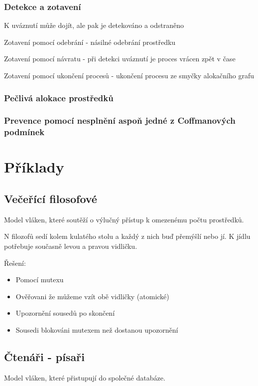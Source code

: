 \documentclass{szzclass}
\begin{document}
\subsubsection{Detekce a zotavení}
K uváznutí může dojít, ale pak je detekováno a odstraněno

Zotavení pomocí odebrání - násilné odebrání prostředku

Zotavení pomocí návratu - při detekci uváznutí je proces vrácen zpět v čase

Zotavení pomocí ukončení procesů - ukončení procesu ze smyčky alokačního grafu

\subsubsection{Pečlivá alokace prostředků}

\subsubsection{Prevence pomocí nesplnění aspoň jedné z Coffmanových podmínek}

\section{Příklady}

\subsection{Večeřící filosofové}
Model vláken, které soutěží o výlučný přístup k omezenému počtu prostředků.

N filozofů sedí kolem kulatého stolu a každý z nich buď přemýšlí nebo jí. K jídlu potřebuje současně levou a pravou vidličku.

Řešení:
\begin{itemize}
    \item Pomocí mutexu
    \item Ověřovani že můžeme vzít obě vidličky (atomické)
    \item Upozornění sousedů po skončení
    \item Sousedi blokováni mutexem než dostanou upozornění
\end{itemize}



\subsection{Čtenáři - písaři}
Model vláken, které přistupují do společné databáze.
\end{document}
